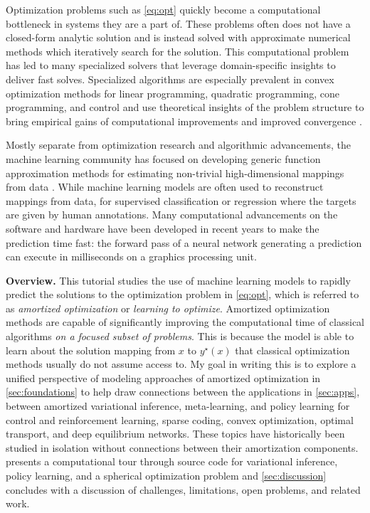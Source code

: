 Optimization problems such as \cref{eq:opt} quickly become a
computational bottleneck in systems they are a part of.
These problems often does not have a closed-form
analytic solution and is instead solved with
approximate numerical methods which iteratively
search for the solution.
This computational problem has led to many specialized
solvers that leverage domain-specific insights to
deliver fast solves.
Specialized algorithms are
especially prevalent in convex optimization methods for
linear programming, quadratic programming, cone programming,
and control and use theoretical insights of the problem
structure to bring empirical gains of computational
improvements and improved convergence
\citep{boyd2004convex,nocedal2006numerical,bertsekas2015convex,bubeck2015convex,nesterov2018lectures}.

Mostly separate from optimization research and algorithmic advancements,
the machine learning community has focused on developing
generic function approximation methods for estimating non-trivial
high-dimensional mappings from data
\citep{murphy2012machine,goodfellow2016deep,deisenroth2020mathematics}.
While machine learning models are often used to reconstruct mappings
from data, \eg for supervised classification or regression where
the targets are given by human annotations.
Many computational advancements on the software and hardware
have been developed in recent years to make the prediction time fast:
the forward pass of a neural network generating a prediction
can execute in milliseconds on a graphics processing unit.

\textbf{Overview.}
This tutorial studies the use of machine learning models to
rapidly predict the solutions to the optimization problem in
\cref{eq:opt}, which is referred to as
\emph{amortized optimization} or \emph{learning to optimize}.
Amortized optimization methods are capable of significantly
improving the computational time of
classical algorithms \emph{on a focused subset of problems}.
This is because the model is able to learn about the
solution mapping from $x$ to $y^\star(x)$ that classical
optimization methods usually do not assume access to.
My goal in writing this is to explore a unified perspective
of modeling approaches of amortized optimization in
\cref{sec:foundations} to help draw connections
between the applications in \cref{sec:apps},
\eg between amortized variational inference, meta-learning,
and policy learning for control and reinforcement learning,
sparse coding, convex optimization, optimal transport,
and deep equilibrium networks.
These topics have historically been studied in isolation
without connections between their amortization components.
 presents a computational tour
through source code for variational inference, policy learning,
and a spherical optimization problem and
\cref{sec:discussion} concludes with a discussion of
challenges, limitations, open problems, and related work.

